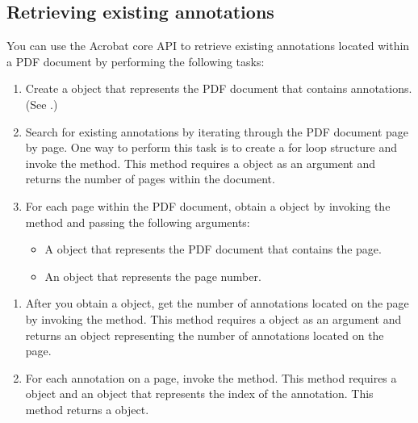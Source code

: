 \documentclass[letterpaper,12pt,english,openany,oneside]{sphinxmanual}
\begin{document}
\subsection{Retrieving existing annotations}
\label{\detokenize{Plugins_Annotations:retrieving-existing-annotations}}
You can use the Acrobat core API to retrieve existing annotations located within a PDF document by performing the following tasks:
\begin{enumerate}
%
\item {} 
Create a  object that represents the PDF document that contains annotations. (See .)

\item {} 
Search for existing annotations by iterating through the PDF document page by page. One way to perform this task is to create a for loop structure and invoke the  method. This method requires a  object as an argument and returns the number of pages within the document.

\item {} 
For each page within the PDF document, obtain a  object by invoking the  method and passing the following arguments:
\begin{itemize}
\item {} 
A  object that represents the PDF document that contains the page.

\item {} 
An  object that represents the page number.

\end{itemize}

\end{enumerate}
\begin{enumerate}
%
\setcounter{enumi}{3}
\item {} 
After you obtain a  object, get the number of annotations located on the page by invoking the  method. This method requires a  object as an argument and returns an  object representing the number of annotations located on the page.

\item {} 
For each annotation on a page, invoke the  method. This method requires a  object and an  object that represents the index of the annotation. This method returns a  object.

\end{enumerate}
\end{document}
